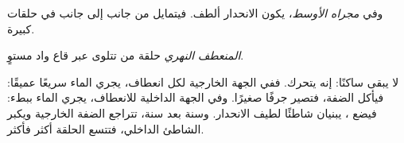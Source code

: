 وفي \emph{مجراه الأوسط}، يكون الانحدار ألطف. فيتمايل  من جانب إلى جانب
في حلقات كبيرة.

\begin{definition}\label{def:g5:water-shapes-the-land:meander}
\emph{المنعطف النهري} حلقة من  تتلوى عبر قاع واد
مستوٍ.
\end{definition}

 لا يبقى ساكنًا: إنه يتحرك. ففي الجهة الخارجية لكل انعطاف، يجري الماء
سريعًا عميقًا: فيأكل الضفة، فتصير جرفًا صغيرًا. وفي الجهة الداخلية للانعطاف،
يجري الماء ببطء: فيضع  ، يبنيان شاطئًا لطيف الانحدار. وسنة بعد
سنة، تتراجع الضفة الخارجية ويكبر الشاطئ الداخلي، فتتسع الحلقة أكثر
فأكثر.

